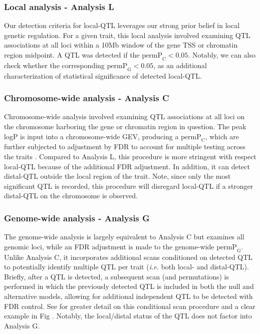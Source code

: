 \documentclass[10pt,letterpaper]{article}
\newcommand{\ie}{\emph{i.e.}\xspace}
\newcommand{\permpc}{\text{permP}_{\text{C}}}
\newcommand{\permpg}{\text{permP}_{\text{G}}}
\begin{document}
\subsubsection*{Local analysis - Analysis L} 
Our detection criteria for local-QTL leverages our strong prior belief in local genetic regulation. For a given trait, this local analysis involved examining QTL associations at all loci within a 10Mb window of the gene TSS or chromatin region midpoint. A QTL was detected if the $\text{permP}_{\text{C}} < 0.05$. Notably, we can also check whether the corresponding $\text{permP}_{\text{G}} < 0.05$, as an additional characterization of statistical significance of detected local-QTL.

\subsubsection*{Chromosome-wide analysis - Analysis C} 
Chromosome-wide analysis involved examining QTL associations at all loci on the chromosome harboring the gene or chromatin region in question. The peak logP is input into a chromosome-wide GEV, producing a $\permpc$, which are further subjected to adjustment by FDR to account for multiple testing across the traits \cite{Chesler2005}. 
Compared to Analysis L, this procedure is more stringent with respect local-QTL because of the additional FDR adjustment. In addition, it can detect distal-QTL outside the local region of the trait. 
Note, since only the most significant QTL is recorded, this procedure will disregard local-QTL if a stronger distal-QTL on the chromosome is observed.

\subsubsection*{Genome-wide analysis - Analysis G} 
The genome-wide analysis is largely equivalent to Analysis C but examines all genomic loci, while an FDR adjustment is made to the genome-wide $\permpg$. Unlike Analysis C, it incorporates additional scans conditioned on detected QTL to potentially identify multiple QTL per trait (\ie both local- and distal-QTL). Briefly, after a QTL is detected, a subsequent scan (and permutations) is performed in which the previously detected QTL is included in both the null and alternative models, allowing for additional independent QTL to be detected with FDR control. See  for greater detail on this conditional scan procedure and a clear example in Fig . Notably, the local/distal status of the QTL does not factor into Analysis G.
\end{document}
